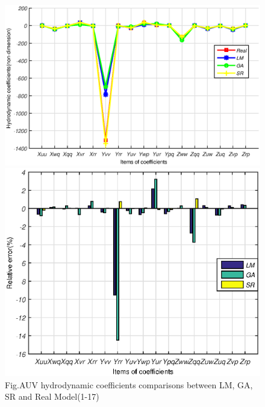 \begin{figure}[!htp]
\centering
\includegraphics[width=14cm]{figure/chap3/four_1_17.eps}
\includegraphics[width=14cm]{figure/chap3/relative_error_1_17.eps}
\label{fig:chap3:F5}
 {Fig.}{AUV hydrodynamic coefficients comparisons between LM, GA, SR and Real Model(1-17)}
\end{figure}


